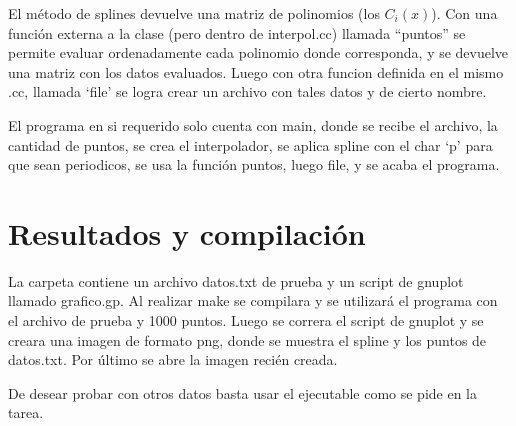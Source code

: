 \documentclass[12pt]{article}
\begin{document}
El método de splines devuelve una matriz de polinomios (los $C_i(x)$). Con una función externa a la clase (pero dentro de interpol.cc) llamada ``puntos'' se permite evaluar ordenadamente cada polinomio donde corresponda, y se devuelve una matriz con los datos evaluados. Luego con otra funcion definida en el mismo .cc, llamada `file' se logra crear un archivo con tales datos y de cierto nombre.

El programa en si requerido solo cuenta con main, donde se recibe el archivo, la cantidad de puntos, se crea el interpolador, se aplica spline con el char `p' para que sean periodicos, se usa la función puntos, luego file, y se acaba el programa.
\section{Resultados y compilación}
La carpeta contiene un archivo datos.txt de prueba y un script de gnuplot llamado grafico.gp. Al realizar make se compilara y se utilizará el programa con el archivo de prueba y 1000 puntos. Luego se correra el script de gnuplot y se creara una imagen de formato png, donde se muestra el spline y los puntos de datos.txt. Por último se abre la imagen recién creada.

De desear probar con otros datos basta usar el ejecutable como se pide en la tarea.
\end{document}
